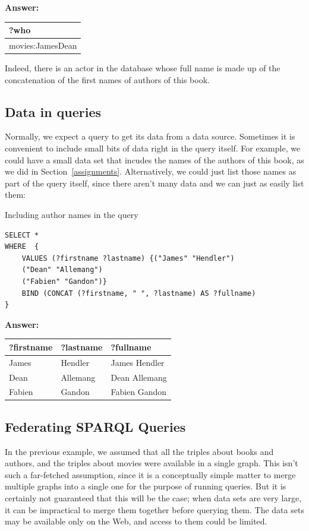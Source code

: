 \textbf{\textbf{Answer:}}

\begin{tabular}{|l|}
\hline
?who\\
\hline
movies:JamesDean\\
\hline
\end{tabular}

Indeed, there is an actor in the database whose full name is made up of
the concatenation of the first names of authors of this book.

\subsection{Data in queries\label{sparqlvalues}}


Normally, we expect a query to get its data from a data source.  Sometimes it 
is convenient to include small bits of data right in the query itself.  For example, we 
could have a small data set that incudes the names of the authors of this book, as we did in 
Section~\ref{assignments}.  Alternatively, we could just list those names 
as part of the query itself, since there aren't many data and we can just as easily
list them: 




\begin{query}Including author names in the query\end{query}
\begin{lstlisting}
SELECT * 
WHERE  {
    VALUES (?firstname ?lastname) {("James" "Hendler")
    ("Dean" "Allemang")
    ("Fabien" "Gandon")}
    BIND (CONCAT (?firstname, " ", ?lastname) AS ?fullname)
}
\end{lstlisting}

\textbf{\textbf{Answer:}}

\begin{tabular}{|lll|}
\hline
?firstname&?lastname&?fullname\\
\hline
James&Hendler&James Hendler\\
Dean&Allemang&Dean Allemang\\
Fabien&Gandon&Fabien Gandon\\
\hline
\end{tabular}



\subsection{Federating SPARQL Queries}

In the previous example, we assumed that all the triples about books and
authors, and the triples about movies were available in a single graph.
This isn't such a far-fetched assumption, since it is a conceptually
simple matter to merge multiple graphs into a single one for the purpose
of running queries. But it is certainly not guaranteed that this will be
the case; when data sets are very large, it can be impractical to merge
them together before querying them. The data sets may be available only
on the Web, and access to them could be limited.

